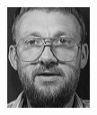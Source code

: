 \begin{frame}
\begin{columns}
\begin{overlayarea}{\textwidth}{\textheight}
\begin{minipage}[t]{0.15\textwidth}
      \end{minipage}
      \begin{minipage}[t]{0.15\textwidth}
        \includegraphics[width=\textwidth]{images/celebrity_images/s14_1.jpg}
      \end{minipage}


\end{overlayarea}
\end{columns}
\end{frame}
